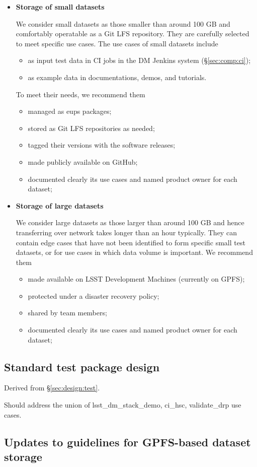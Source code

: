 \begin{itemize}
  \item \textbf{Storage of small datasets}

  We consider small datasets as those smaller than around 100 GB
  and comfortably operatable as a Git LFS repository. They are
  carefully selected to meet specific use cases. The use cases of
  small datasets include

  \begin{itemize}
    \item{as input test data in CI jobs in the DM Jenkins system
          (\S\ref{sec:comp:ci});}
    \item{as example data in documentations, demos, and tutorials.}
  \end{itemize}

  To meet their needs, we recommend them

  \begin{itemize}
    \item{managed as eups packages;}
    \item{stored as Git LFS repositories as needed;}
    \item{tagged their versions with the software releases;}
    \item{made publicly available on GitHub;}
    \item{documented clearly its use cases and named product owner for each dataset;}
  \end{itemize}

  \item \textbf{Storage of large datasets}

  We consider large datasets as those larger than around 100 GB and
  hence transferring over network takes longer than an hour typically.
  They can contain edge cases that have not been identified to form
  specific small test datasets, or for use cases in which data
  volume is important.  We recommend them

  \begin{itemize}
    \item{made available on LSST Development Machines (currently on GPFS);}
    \item{protected under a disaster recovery policy;}
    \item{shared by team members;}
    \item{documented clearly its use cases and named product owner for each dataset;}
  \end{itemize}

\end{itemize}



\subsection{Standard test package design}

Derived from \S\ref{sec:design:test}.


Should address the union of lsst\_dm\_stack\_demo, ci\_hsc, validate\_drp use
cases.

\subsection{Updates to guidelines for GPFS-based dataset storage}
\label{sec:comp:gpfs-dataset}
